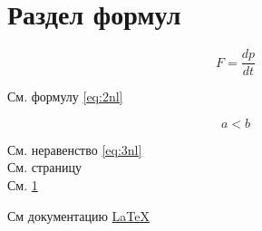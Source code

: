 \documentclass[a4paper, 12pt]{article}
\begin{document}
    \section{Раздел формул} \label{text_1}

    \begin{equation} \label{eq:2nl} %
        F = \frac{dp}{dt} %
    \end{equation}

    См. формулу \eqref{eq:2nl} %

    \[ \label{eq:3nl} %
        a < b \tag{Нер. 1}
    \]

    См. неравенство \eqref{eq:3nl}\\ %

    См. страницу \pageref{eq:2nl}\\ %

    См. \ref{text_1} %

    См документацию \href{https://www.latex-project.org/help/documentation/}{LaTeX}
\end{document}
